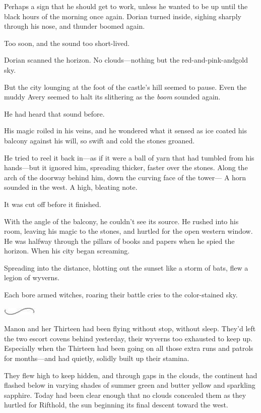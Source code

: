 Perhaps a sign that he should get to work, unless he wanted to be up until the black hours of the morning once again.
Dorian turned inside, sighing sharply through his nose, and thunder boomed again.

Too soon, and the sound too short-lived.

Dorian scanned the horizon.
No clouds---nothing but the red-and-pink-andgold sky.

But the city lounging at the foot of the castle's hill seemed to pause.
Even the muddy Avery seemed to halt its slithering as the \emph{boom}
sounded again.

He had heard that sound before.

His magic roiled in his veins, and he wondered what it sensed as ice coated his balcony against his will, so swift and cold the stones groaned.

He tried to reel it back in---as if it were a ball of yarn that had tumbled from his hands---but it ignored him, spreading thicker, faster over the stones.
Along the arch of the doorway behind him, down the curving face of the tower--- A horn sounded in the west.
A high, bleating note.

It was cut off before it finished.

With the angle of the balcony, he couldn't see its source.
He rushed into his room, leaving his magic to the stones, and hurtled for the open western window.
He was halfway through the pillars of books and papers when he spied the horizon.
When his city began screaming.

Spreading into the distance, blotting out the sunset like a storm of bats, flew a legion of wyverns.

Each bore armed witches, roaring their battle cries to the color-stained sky.

\begin{center}
	\includegraphics[width=0.65in,height=0.13in]{images/seperator}
\end{center}

Manon and her Thirteen had been flying without stop, without sleep.
They'd left the two escort covens behind yesterday, their wyverns too exhausted to keep up.
Especially when the Thirteen had been going on all those extra runs and patrols for months---and had quietly, solidly built up their stamina.

They flew high to keep hidden, and through gaps in the clouds, the continent had flashed below in varying shades of summer green and butter yellow and sparkling sapphire.
Today had been clear enough that no clouds concealed them as they hurtled for Rifthold, the sun beginning its final descent toward the west.

